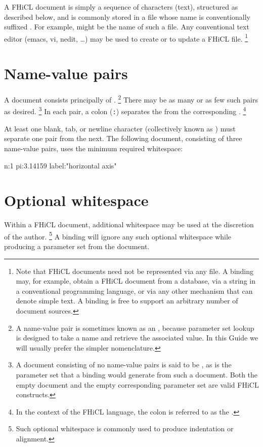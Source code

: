 \documentclass{memarticle}
\newcommand{\fhicl}{FHiCL\xspace}
\begin{document}
A \fhicl document is simply a sequence of characters (\ie text),
structured as described below, and is commonly stored in a file whose
name is conventionally suffixed .  For example,
 might be the name of such a file.  Any
conventional text editor (\eg emacs, vi, nedit, \ldots) may be used to
create or to update a \fhicl file.%
\footnote{%
  Note that \fhicl documents need not be represented via any file.  A
  binding may, for example, obtain a \fhicl document from a database,
  via a string in a conventional programming language, or via any
  other mechanism that can denote simple text.  A binding is free to
  support an arbitrary number of document sources.%
}

\section{Name-value pairs}

A document consists principally of .%
\footnote{%
  A name-value pair is sometimes known as an ,
  because parameter set lookup is designed to take a name and retrieve
  the associated value.  In this Guide we will usually prefer the
  simpler  nomenclature.%
} There may be as many or as few such pairs as desired.%
\footnote{%
  A document consisting of no name-value pairs is said to be
  , as is the parameter set that a binding would generate
  from such a document.  Both the empty document and the empty
  corresponding parameter set are valid FHiCL constructs.%
} In each pair, a colon (\verb|:|) separates the  from the
corresponding .%
\footnote{%
  In the context of the FHiCL language, the colon is referred to as
  the .  }

At least one blank, tab, or newline character (collectively known as
) must separate one pair from the next.  The
following document, consisting of three name-value pairs, uses the
minimum required whitespace: 
\Needspace{.17in}
\begin{fcllisting}[texcl,escapechar=`]
n:1 pi:3.14159 label:"horizontal axis"
\end{fcllisting}

\section{Optional whitespace}

Within a \fhicl document, additional whitespace may be used at the
discretion of the author.%
\footnote{%
  Such optional whitespace is commonly used to produce indentation or
  alignment.%
} A binding will ignore any such optional whitespace while producing a
parameter set from the document.
\end{document}
